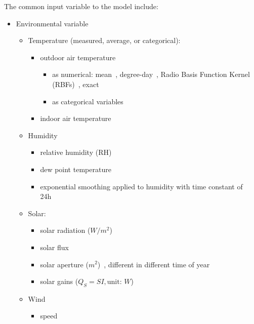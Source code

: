 \documentclass[12pt]{article}
\begin{document}
The common input variable to the model include:
\begin{itemize}
\item Environmental variable
  \begin{itemize}
  \item Temperature (measured, average, or categorical): 
    \begin{itemize}
    \item outdoor air temperature
      \begin{itemize}
      \item as numerical: mean~\cite{haberl1994bin,
          hammarsten1987critical, kissock2008methodology,
          dong2005applying, leanEng},
        degree-day~\cite{reddy1997baselining, fels1986prism,
          pmWeather}, Radio Basis Function Kernel
        (RBFs)~\cite{wytock2013contextually},
        exact~\cite{mackay1996bayesian, Zhang2015177, cao2003support}
      \item as categorical variables~\cite{Yu20101637}
      \end{itemize}
    \item indoor air temperature~\cite{hammarsten1987critical}
    \end{itemize}
  \item Humidity
    \begin{itemize}
    \item relative humidity (RH)~\cite{dong2005applying}
    \item dew point temperature~\cite{cao2003support}
    \item exponential smoothing applied to humidity with time constant of 24h~\cite{brown2012kernel}
    \end{itemize}
  \item Solar: 
    \begin{itemize}
    \item solar radiation ($W / m^2$)~\cite{hammarsten1987critical, dong2005applying, flouquet1992local}
    \item solar flux~\cite{mackay1996bayesian}
    \item solar aperture ($m^2$)~\cite{hammarsten1987critical}, different in different time of year
    \item solar gains ($Q_S = SI, \text{unit: } W$)~\cite{hammarsten1987critical}
    \end{itemize}
  \item Wind 
    \begin{itemize}
    \item speed~\cite{mackay1996bayesian}

\end{itemize}
\end{itemize}
\end{itemize}
\end{document}
